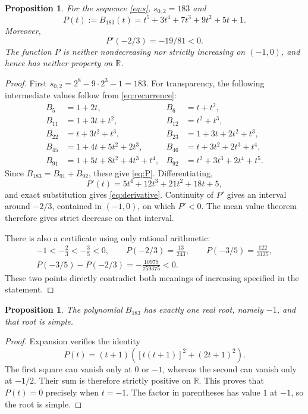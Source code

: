 \documentclass[11pt]{article}
\newtheorem{proposition}[theorem]{Proposition}
\theoremstyle{remark}
\newcommand{\R}{\mathbb{R}}
\begin{document}
\begin{proposition}\label{prop:counterexample}
For the sequence \eqref{eq:s}, $s_{0,2}=183$ and
\begin{equation}\label{eq:P}
 P(t):=B_{183}(t)=t^5+3t^4+7t^3+9t^2+5t+1.
\end{equation}
Moreover,
\begin{equation}\label{eq:derivative}
 P'(-2/3)=-19/81<0.
\end{equation}
The function $P$ is neither nondecreasing nor strictly increasing on
$(-1,0)$, and hence has neither property on $\R$.
\end{proposition}
\begin{proof}
First $s_{0,2}=2^8-9\cdot2^3-1=183$. For transparency, the
following intermediate values follow from \eqref{eq:recurrence}:
\begin{align*}
 B_5&=1+2t, & B_6&=t+t^2,\\
 B_{11}&=1+3t+t^2, & B_{12}&=t^2+t^3,\\
 B_{22}&=t+3t^2+t^3, & B_{23}&=1+3t+2t^2+t^3,\\
 B_{45}&=1+4t+5t^2+2t^3, & B_{46}&=t+3t^2+2t^3+t^4,\\
 B_{91}&=1+5t+8t^2+4t^3+t^4,
 & B_{92}&=t^2+3t^3+2t^4+t^5.
\end{align*}
Since $B_{183}=B_{91}+B_{92}$, these give \eqref{eq:P}.
Differentiating,
\[
 P'(t)=5t^4+12t^3+21t^2+18t+5,
\]
and exact substitution gives \eqref{eq:derivative}. Continuity of
$P'$ gives an interval around $-2/3$, contained in $(-1,0)$,
on which $P'<0$. The mean value theorem therefore gives strict
decrease on that interval.

There is also a certificate using only rational arithmetic:
\begin{gather*}
 -1<-\frac23<-\frac35<0,\qquad
 P(-2/3)=\frac{13}{243},\qquad P(-3/5)=\frac{122}{3125},\\
 P(-3/5)-P(-2/3)=-\frac{10979}{759375}<0.
\end{gather*}
These two points directly contradict both meanings of increasing
specified in the statement.
\end{proof}

\begin{proposition}\label{prop:root}
The polynomial $B_{183}$ has exactly one real root, namely $-1$,
and that root is simple.
\end{proposition}
\begin{proof}
Expansion verifies the identity
\[
 P(t)=(t+1)\left([t(t+1)]^2+(2t+1)^2\right).
\]
The first square can vanish only at $0$ or $-1$, whereas the second
can vanish only at $-1/2$. Their sum is therefore strictly positive
on $\R$. This proves that $P(t)=0$ precisely when $t=-1$.
The factor in parentheses has value $1$ at $-1$, so the root is simple.
\end{proof}
\end{document}
